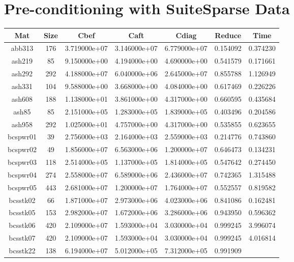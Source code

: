 \section{Pre-conditioning with SuiteSparse Data}

\begin{table}[h]
  \begin{tabular}{ccccccc}
    \hline
    Mat & Size & Cbef & Caft & Cdiag & Reduce & Time\\
    \hline
    abb313 & 176 & 3.719000e+07 & 3.146000e+07 & 6.779000e+07 & 0.154092 &
    0.374230\\
    ash219 & 85 & 9.150000e+00 & 4.194000e+00 & 4.690000e+00 & 0.541579 &
    0.171661\\
    ash292 & 292 & 4.188000e+07 & 6.040000e+06 & 2.645000e+07 & 0.855788 &
    1.126949\\
    ash331 & 104 & 9.588000e+00 & 3.668000e+00 & 4.084000e+00 & 0.617469 &
    0.226226\\
    ash608 & 188 & 1.138000e+01 & 3.861000e+00 & 4.317000e+00 & 0.660595 &
    0.435684\\
    ash85 & 85 & 2.151000e+05 & 1.283000e+05 & 1.839000e+05 & 0.403496 &
    0.204586\\
    ash958 & 292 & 1.025000e+01 & 4.757000e+00 & 4.317000e+00 & 0.535855 &
    0.623655\\
    bcspwr01 & 39 & 2.756000e+03 & 2.164000e+03 & 2.559000e+03 & 0.214776 &
    0.743860\\
    bcspwr02 & 49 & 1.856000e+07 & 6.563000e+06 & 1.200000e+07 & 0.646473 &
    0.134231\\
    bcspwr03 & 118 & 2.514000e+05 & 1.137000e+05 & 1.814000e+05 & 0.547642 &
    0.274450\\
    bcspwr04 & 274 & 2.558000e+07 & 6.589000e+06 & 2.436000e+07 & 0.742365 &
    1.315488\\
    bcspwr05 & 443 & 2.681000e+07 & 1.200000e+07 & 1.764000e+07 & 0.552557 &
    0.819582\\
    bcsstk02 & 66 & 1.871000e+07 & 2.973000e+06 & 4.023000e+06 & 0.841086 &
    0.162481\\
    bcsstk05 & 153 & 2.982000e+07 & 1.672000e+06 & 3.286000e+06 & 0.943950 &
    0.596362\\
    bcsstk06 & 420 & 2.109000e+07 & 1.593000e+04 & 3.030000e+04 & 0.999245 &
    3.996074\\
    bcsstk07 & 420 & 2.109000e+07 & 1.593000e+04 & 3.030000e+04 & 0.999245 &
    4.016814\\
    bcsstk22 & 138 & 6.194000e+07 & 5.012000e+05 & 7.312000e+05 & 0.991909 &

\end{tabular}
\end{table}
